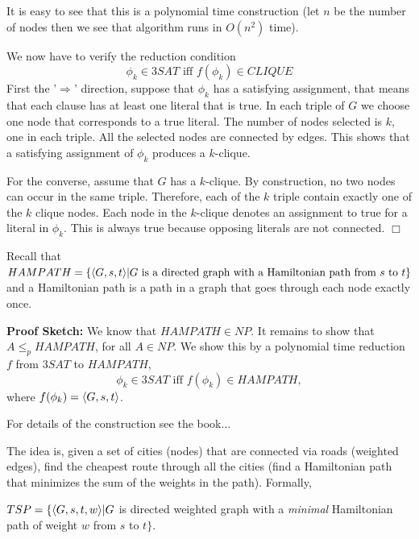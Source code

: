 \documentclass[a4paper,blends,pdf,colorBG,slideColor]{prosper}
\begin{document}
{\small
It is easy to see that this is a polynomial time construction (let $n$ be the number of
nodes then we see that algorithm runs in $O(n^2)$ time).

We now have to verify the reduction condition
\[
\phi_k \in 3SAT \mbox{ iff } f(\phi_k) \in CLIQUE
\]
First the '$\Rightarrow$' direction, suppose that $\phi_k$ has a satisfying assignment,
that means that each clause has at least one literal that is true.
In each triple of $G$ we choose one node that corresponds to a true literal.
The number of nodes selected is $k$, one in each triple.
All the selected nodes are connected by edges.  This shows that a satisfying
assignment of $\phi_k$ produces a $k$-clique.

For the converse, assume that $G$ has a $k$-clique.  By construction, no two nodes
can occur in the same triple.  Therefore, each of the $k$ triple contain exactly
one of the $k$ clique nodes.  Each node in the $k$-clique denotes an assignment
to true for a literal in $\phi_k$.  This is always true because opposing literals are not
connected. $\Box$
}
\es

{\small
Recall that $HAMPATH = \{ \langle {G,s,t} \rangle|\mbox{$G$ is a directed graph with a Hamiltonian path from $s$ to $t$}\}$ and a Hamiltonian path is a path in a graph that goes through each node exactly once.

{\bf Proof Sketch:} We know that $HAMPATH \in NP$.  It remains to show that
$A \le_p HAMPATH$, for all $A \in NP$.  We show this by a polynomial time reduction $f$
from $3SAT$ to $HAMPATH$,
\[
\phi_k \in 3SAT \mbox{ iff } f(\phi_k) \in HAMPATH,
\]
where $f(\phi_k) = \langle {G,s,t} \rangle$.

For details of the construction see the book$\ldots$
}
\es



\es

{\small
The idea is, given a set of cities (nodes) that are connected via roads (weighted edges), find the cheapest route through all the cities (find a Hamiltonian path that minimizes the sum of the weights
in the path).  Formally,

$TSP = \{ \langle {G,s,t,w} \rangle | G$ is directed weighted graph with a {\em minimal} Hamiltonian path of
weight $w$ from $s$ to $t \}.$
}
\es
\end{document}
